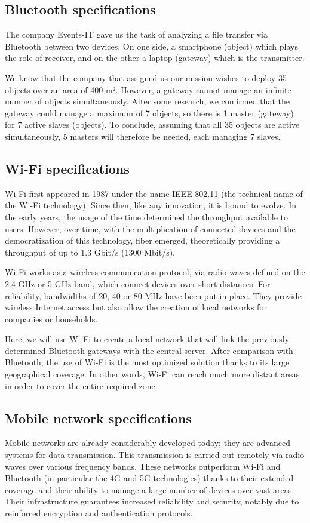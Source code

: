 \documentclass[12]{article}
\begin{document}
\subsection{Bluetooth specifications}

The company Events-IT gave us the task of analyzing a file transfer via Bluetooth between two devices. On one side, a smartphone (object) which plays the role of receiver, and on the other a laptop (gateway) which is the transmitter.

We know that the company that assigned us our mission wishes to deploy 35 objects over an area of 400 m². However, a gateway cannot manage an infinite number of objects simultaneously. After some research, we confirmed that the gateway could manage a maximum of 7 objects, so there is 1 master (gateway) for 7 active slaves (objects). To conclude, assuming that all 35 objects are active simultaneously, 5 masters will therefore be needed, each managing 7 slaves.

\subsection{Wi-Fi specifications}

Wi-Fi first appeared in 1987 under the name IEEE 802.11 (the technical name of the Wi-Fi technology).
Since then, like any innovation, it is bound to evolve. In the early years, the usage of the time determined the throughput available to users. However, over time, with the multiplication of connected devices and the democratization of this technology, fiber emerged, theoretically providing a throughput of up to 1.3 Gbit/s (1300 Mbit/s).

Wi-Fi works as a wireless communication protocol, via radio waves defined on the 2.4 GHz or 5 GHz band, which connect devices over short distances. For reliability, bandwidths of 20, 40 or 80 MHz have been put in place. They provide wireless Internet access but also allow the creation of local networks for companies or households.

Here, we will use Wi-Fi to create a local network that will link the previously determined Bluetooth gateways with the central server. After comparison with Bluetooth, the use of Wi-Fi is the most optimized solution thanks to its large geographical coverage. In other words, Wi-Fi can reach much more distant areas in order to cover the entire required zone.

\subsection{Mobile network specifications}
Mobile networks are already considerably developed today; they are advanced systems for data transmission. This transmission is carried out remotely via radio waves over various frequency bands. These networks outperform Wi-Fi and Bluetooth (in particular the 4G and 5G technologies) thanks to their extended coverage and their ability to manage a large number of devices over vast areas. Their infrastructure guarantees increased reliability and security, notably due to reinforced encryption and authentication protocols. \\
\end{document}
